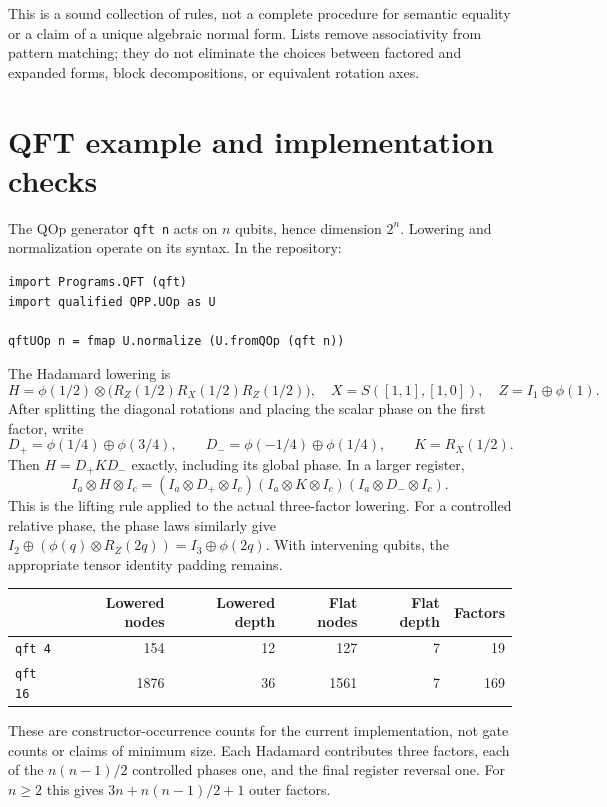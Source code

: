 \documentclass[11pt,a4paper]{article}
\newcommand{\code}[1]{\texttt{#1}}
\newcommand{\Ph}[1]{\phi(#1)}
\begin{document}
This is a sound collection of rules, not a complete procedure for
semantic equality or a claim of a unique algebraic normal form.
Lists remove associativity from pattern matching; they do not eliminate
the choices between factored and expanded forms, block decompositions,
or equivalent rotation axes.

\section{QFT example and implementation checks}

The QOp generator \code{qft n} acts on $n$ qubits, hence dimension $2^n$.
Lowering and normalization operate on its syntax. In the repository:

\begin{lstlisting}[caption={Repository entry point; separate from the standalone listings.}]
import Programs.QFT (qft)
import qualified QPP.UOp as U

qftUOp n = fmap U.normalize (U.fromQOp (qft n))
\end{lstlisting}

The Hadamard lowering is
\[
 H=\Ph{1/2}\otimes
   \bigl(R_Z(1/2)R_X(1/2)R_Z(1/2)\bigr),\quad
 X=S([1,1],[1,0]),\quad Z=I_1\oplus\Ph1.
\]
After splitting the diagonal rotations and placing the scalar phase
on the first factor, write
\[
 D_+=\Ph{1/4}\oplus\Ph{3/4},\qquad
 D_-=\Ph{-1/4}\oplus\Ph{1/4},\qquad K=R_X(1/2).
\]
Then $H=D_+KD_-$ exactly, including its global phase. In a larger register,
\[
 I_a\otimes H\otimes I_c
 =(I_a\otimes D_+\otimes I_c)
  (I_a\otimes K\otimes I_c)
  (I_a\otimes D_-\otimes I_c).
\]
This is the lifting rule applied to the actual three-factor lowering.
For a controlled relative phase, the phase laws similarly give
$I_2\oplus(\Ph q\otimes R_Z(2q))=I_3\oplus\Ph{2q}$.
With intervening qubits, the appropriate tensor identity padding remains.

\begin{center}
\begin{tabular}{@{}lrrrrr@{}}
\toprule
& Lowered nodes & Lowered depth & Flat nodes & Flat depth & Factors\\
\midrule
\code{qft 4}  & 154 & 12 & 127  & 7 & 19\\
\code{qft 16} & 1876 & 36 & 1561 & 7 & 169\\
\bottomrule
\end{tabular}
\end{center}
These are constructor-occurrence counts for the current implementation,
not gate counts or claims of minimum size. Each Hadamard contributes
three factors, each of the $n(n-1)/2$ controlled phases one, and the
final register reversal one. For $n\ge2$ this gives
$3n+n(n-1)/2+1$ outer factors.
\end{document}
